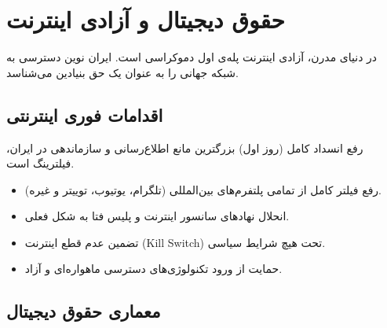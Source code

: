 \chapter{حقوق دیجیتال و آزادی اینترنت}
\label{app:digital}

در دنیای مدرن، آزادی اینترنت پله‌ی اول دموکراسی است. ایران نوین دسترسی به شبکه جهانی را به عنوان یک حق بنیادین می‌شناسد.

\section{اقدامات فوری اینترنتی}

\begin{modernbox}{رفع انسداد کامل (روز اول)}
بزرگترین مانع اطلاع‌رسانی و سازماندهی در ایران، فیلترینگ است.
\begin{itemize}
    \item رفع فیلتر کامل از تمامی پلتفرم‌های بین‌المللی (تلگرام، یوتیوب، توییتر و غیره).
    \item انحلال نهادهای سانسور اینترنت و پلیس فتا به شکل فعلی.
    \item تضمین عدم قطع اینترنت (Kill Switch) تحت هیچ شرایط سیاسی.
    \item حمایت از ورود تکنولوژی‌های دسترسی ماهواره‌ای و آزاد.
\end{itemize}
\end{modernbox}

\section{معماری حقوق دیجیتال}

\begin{center}
\end{center}

